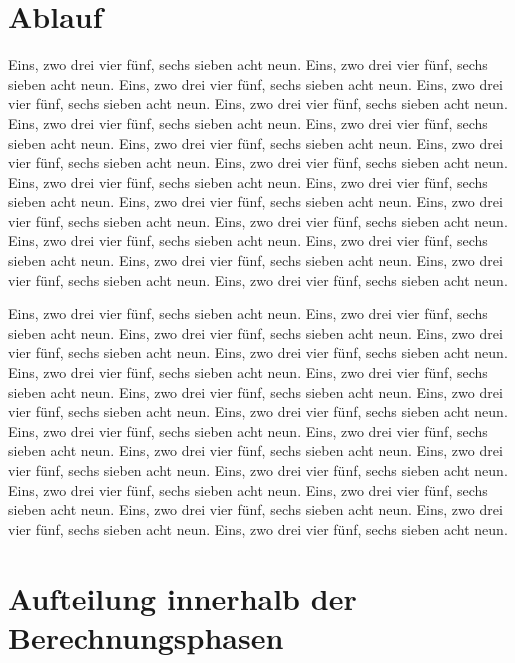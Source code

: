 \documentclass[12pt,a4paper]{article}
\begin{document}
\section{Ablauf}

Eins, zwo drei vier fünf, sechs sieben acht neun.
Eins, zwo drei vier fünf, sechs sieben acht neun.
Eins, zwo drei vier fünf, sechs sieben acht neun.
Eins, zwo drei vier fünf, sechs sieben acht neun.
Eins, zwo drei vier fünf, sechs sieben acht neun.
Eins, zwo drei vier fünf, sechs sieben acht neun.
Eins, zwo drei vier fünf, sechs sieben acht neun.
Eins, zwo drei vier fünf, sechs sieben acht neun.
Eins, zwo drei vier fünf, sechs sieben acht neun.
Eins, zwo drei vier fünf, sechs sieben acht neun.
Eins, zwo drei vier fünf, sechs sieben acht neun.
Eins, zwo drei vier fünf, sechs sieben acht neun.
Eins, zwo drei vier fünf, sechs sieben acht neun.
Eins, zwo drei vier fünf, sechs sieben acht neun.
Eins, zwo drei vier fünf, sechs sieben acht neun.
Eins, zwo drei vier fünf, sechs sieben acht neun.
Eins, zwo drei vier fünf, sechs sieben acht neun.
Eins, zwo drei vier fünf, sechs sieben acht neun.
Eins, zwo drei vier fünf, sechs sieben acht neun.
Eins, zwo drei vier fünf, sechs sieben acht neun.

Eins, zwo drei vier fünf, sechs sieben acht neun.
Eins, zwo drei vier fünf, sechs sieben acht neun.
Eins, zwo drei vier fünf, sechs sieben acht neun.
Eins, zwo drei vier fünf, sechs sieben acht neun.
Eins, zwo drei vier fünf, sechs sieben acht neun.
Eins, zwo drei vier fünf, sechs sieben acht neun.
Eins, zwo drei vier fünf, sechs sieben acht neun.
Eins, zwo drei vier fünf, sechs sieben acht neun.
Eins, zwo drei vier fünf, sechs sieben acht neun.
Eins, zwo drei vier fünf, sechs sieben acht neun.
Eins, zwo drei vier fünf, sechs sieben acht neun.
Eins, zwo drei vier fünf, sechs sieben acht neun.
Eins, zwo drei vier fünf, sechs sieben acht neun.
Eins, zwo drei vier fünf, sechs sieben acht neun.
Eins, zwo drei vier fünf, sechs sieben acht neun.
Eins, zwo drei vier fünf, sechs sieben acht neun.
Eins, zwo drei vier fünf, sechs sieben acht neun.
Eins, zwo drei vier fünf, sechs sieben acht neun.
Eins, zwo drei vier fünf, sechs sieben acht neun.
Eins, zwo drei vier fünf, sechs sieben acht neun.

\section{Aufteilung innerhalb der Berechnungsphasen}
\end{document}
